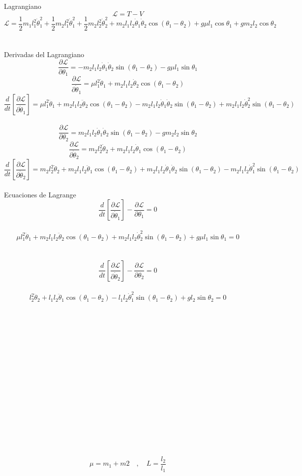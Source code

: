 \documentclass[10pt,a4papper]{article}
\begin{document}
\newpage
Lagrangiano
\[\mathcal{L}=T-V\]
\[\mathcal{L}=\frac{1}{2}m_1l_1^2\dot\theta_1^2+\frac{1}{2}m_2l_1^2\dot\theta_1^2+\frac{1}{2}m_2l_2^2\dot\theta_2^2+m_2l_1l_2\dot\theta_1\dot\theta_2\cos(\theta_1-\theta_2)+g\mu l_1\cos\theta_1+gm_2l_2\cos\theta_2\]\\\\
Derivadas del Lagrangiano
\[\frac{\partial\mathcal{L}}{\partial\theta_1}=-m_2l_1l_2\dot\theta_1\dot\theta_2\sin(\theta_1-\theta_2)-g\mu l_1\sin\theta_1\]
\[\frac{\partial\mathcal{L}}{\partial\dot\theta_1}=\mu l_1^2\dot\theta_1+m_2l_1l_2\dot\theta_2\cos(\theta_1-\theta_2)\]
\[\frac{d}{dt}\left[\frac{\partial\mathcal{L}}{\partial\dot\theta_1}\right]=\mu l_1^2\ddot\theta_1+m_2l_1l_2\ddot\theta_2\cos(\theta_1-\theta_2)-m_2l_1l_2\dot\theta_1\dot\theta_2\sin(\theta_1-\theta_2)+m_2l_1l_2\dot\theta_2^2\sin(\theta_1-\theta_2)\]\\
\[\frac{\partial\mathcal{L}}{\partial\theta_2}=m_2l_1l_2\dot\theta_1\dot\theta_2\sin(\theta_1-\theta_2)-gm_2l_2\sin\theta_2\]
\[\frac{\partial\mathcal{L}}{\partial\dot\theta_2}=m_2l_2^2\dot\theta_2+m_2l_1l_2\dot\theta_1\cos(\theta_1-\theta_2)\]
\[\frac{d}{dt}\left[\frac{\partial\mathcal{L}}{\partial\dot\theta_2}\right]=m_2l_2^2\ddot\theta_2+m_2l_1l_2\ddot\theta_1\cos(\theta_1-\theta_2)+m_2l_1l_2\dot\theta_1\dot\theta_2\sin(\theta_1-\theta_2)-m_2l_1l_2\dot\theta_1^2\sin(\theta_1-\theta_2)\]\\

\newpage
Ecuaciones de Lagrange
\[\frac{d}{dt}\left[\frac{\partial\mathcal{L}}{\partial\dot \theta_1}\right]-\frac{\partial\mathcal{L}}{\partial \theta_1}=0\]\\
\[\mu l_1^2\ddot\theta_1+m_2l_1l_2\ddot\theta_2\cos(\theta_1-\theta_2)+m_2l_1l_2\dot\theta_2^2\sin(\theta_1-\theta_2)+g\mu l_1\sin\theta_1=0\]
\[\]\\\\
\[\frac{d}{dt}\left[\frac{\partial\mathcal{L}}{\partial\dot \theta_2}\right]-\frac{\partial\mathcal{L}}{\partial \theta_2}=0\]\\
\[l_2^2\ddot\theta_2+l_1l_2\ddot\theta_1\cos(\theta_1-\theta_2)-l_1l_2\dot\theta_1^2\sin(\theta_1-\theta_2)+gl_2\sin\theta_2=0\]\\\\\\\\\\\\\\\\\\\\\\\\\\\\\\\\
\[\mu=m_1+m2\quad,\quad L=\frac{l_2}{l_1}\]
\end{document}
